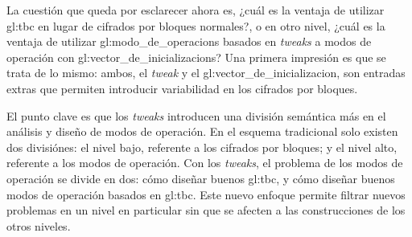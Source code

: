 
La cuestión que queda por esclarecer ahora es, ¿cuál es la ventaja de utilizar
\gls{gl:tbc} en lugar de cifrados por bloques normales?, o en otro nivel,
¿cuál es la ventaja de utilizar \glspl{gl:modo_de_operacion} basados en
\textit{tweaks} a modos de operación con \glspl{gl:vector_de_inicializacion}?
Una primera impresión es que se trata de lo mismo: ambos, el \textit{tweak} y
el \gls{gl:vector_de_inicializacion}, son entradas extras que permiten
introducir variabilidad en los cifrados por bloques.

El punto clave es que los \textit{tweaks} introducen una división semántica
más en el análisis y diseño de modos de operación. En el esquema tradicional
solo existen dos divisiónes: el nivel bajo, referente a los cifrados por
bloques; y el nivel alto, referente a los modos de operación. Con los
\textit{tweaks}, el problema de los modos de operación se divide en dos:
cómo diseñar buenos \gls{gl:tbc}, y cómo diseñar buenos modos de operación
basados en \gls{gl:tbc}. Este nuevo enfoque permite filtrar nuevos problemas
en un nivel en particular sin que se afecten a las construcciones de los otros
niveles.

